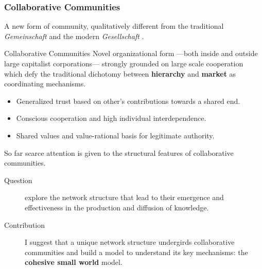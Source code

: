 \documentclass[ignorenonframetext,red,8pt,notes=show]{beamer}
\begin{document}
\begin{frame}
\frametitle{Collaborative Communities}
A new form of community, qualitatively different from the traditional \emph{Gemeinschaft} and the modern \emph{Gesellschaft} \citep{tonnies:1974}. 

\begin{block}{Collaborative Communities \citep{adler:2006}}
Novel organizational form ---both inside and outside large capitalist corporations--- strongly grounded on large scale cooperation which defy the traditional dichotomy between \textbf{hierarchy} and \textbf{market} as coordinating mechanisms.

\begin{itemize}
\item Generalized trust based on other's contributions towards a shared end.
\item Conscious cooperation and high individual interdependence.
\item Shared values and value-rational basis for legitimate authority. 
\end{itemize}
\end{block}

So far scarce attention is given to the structural features of collaborative communities.

\begin{description}
\item[Question] explore the network structure that lead to their emergence and effectiveness in the production and diffusion of knowledge.

\item[Contribution] I suggest that a unique network structure undergirds collaborative communities and build a model to understand its key mechanisms: the \textbf{cohesive small world} model.
\end{description}

\end{frame}
\end{document}
